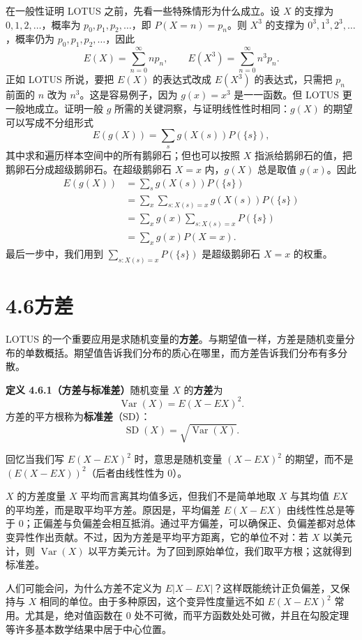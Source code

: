 \documentclass[UTF8, 12pt, fontset=fandol, oneside]{ctexart}
\begin{document}
在一般性证明 LOTUS 之前，先看一些特殊情形为什么成立。设 $X$ 的支撑为 $0,1,2,\ldots$，概率为 $p_0,p_1,p_2,\ldots$，即 $P(X=n)=p_n$。则 $X^3$ 的支撑为 $0^3,1^3,2^3,\ldots$，概率仍为 $p_0,p_1,p_2,\ldots$，因此
\[
  E(X)=\sum_{n=0}^{\infty}np_n,\qquad
  E(X^3)=\sum_{n=0}^{\infty}n^3p_n.
\]
正如 LOTUS 所说，要把 $E(X)$ 的表达式改成 $E(X^3)$ 的表达式，只需把 $p_n$ 前面的 $n$ 改为 $n^3$。这是容易例子，因为 $g(x)=x^3$ 是一一函数。但 LOTUS 更一般地成立。证明一般 $g$ 所需的关键洞察，与证明线性性时相同：$g(X)$ 的期望可以写成不分组形式
\[
  E(g(X))=\sum_s g(X(s))P(\{s\}),
\]
其中求和遍历样本空间中的所有鹅卵石；但也可以按照 $X$ 指派给鹅卵石的值，把鹅卵石分成超级鹅卵石。在超级鹅卵石 $X=x$ 内，$g(X)$ 总是取值 $g(x)$。因此
\[
\begin{aligned}
  E(g(X))
  &=\sum_s g(X(s))P(\{s\})\\
  &=\sum_x \sum_{s:X(s)=x} g(X(s))P(\{s\})\\
  &=\sum_x g(x)\sum_{s:X(s)=x}P(\{s\})\\
  &=\sum_x g(x)P(X=x).
\end{aligned}
\]
最后一步中，我们用到 $\sum_{s:X(s)=x}P(\{s\})$ 是超级鹅卵石 $X=x$ 的权重。

\section*{4.6\quad 方差}

LOTUS 的一个重要应用是求随机变量的\textbf{方差}。与期望值一样，方差是随机变量分布的单数概括。期望值告诉我们分布的质心在哪里，而方差告诉我们分布有多分散。

\noindent\textbf{定义 4.6.1（方差与标准差）}\quad 随机变量 $X$ 的\textbf{方差}为
\[
  \operatorname{Var}(X)=E(X-EX)^2.
\]
方差的平方根称为\textbf{标准差}（SD）：
\[
  \operatorname{SD}(X)=\sqrt{\operatorname{Var}(X)}.
\]

回忆当我们写 $E(X-EX)^2$ 时，意思是随机变量 $(X-EX)^2$ 的期望，而不是 $(E(X-EX))^2$（后者由线性性为 $0$）。

$X$ 的方差度量 $X$ 平均而言离其均值多远，但我们不是简单地取 $X$ 与其均值 $EX$ 的平均差，而是取平均平方差。原因是，平均偏差 $E(X-EX)$ 由线性性总是等于 $0$；正偏差与负偏差会相互抵消。通过平方偏差，可以确保正、负偏差都对总体变异性作出贡献。不过，因为方差是平均平方距离，它的单位不对：若 $X$ 以美元计，则 $\operatorname{Var}(X)$ 以平方美元计。为了回到原始单位，我们取平方根；这就得到标准差。

人们可能会问，为什么方差不定义为 $E|X-EX|$？这样既能统计正负偏差，又保持与 $X$ 相同的单位。由于多种原因，这个变异性度量远不如 $E(X-EX)^2$ 常用。尤其是，绝对值函数在 $0$ 处不可微，而平方函数处处可微，并且在勾股定理等许多基本数学结果中居于中心位置。
\end{document}
